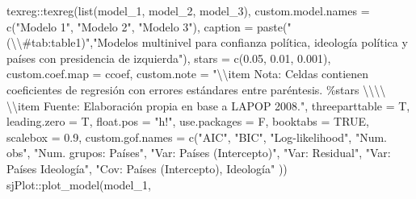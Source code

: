 \documentclass[
  12pt,
  a4paper,
]{article}
\newenvironment{Shaded}{\begin{snugshade}}{\end{snugshade}}
\newcommand{\AttributeTok}[1]{\textcolor[rgb]{0.77,0.63,0.00}{#1}}
\newcommand{\ConstantTok}[1]{\textcolor[rgb]{0.00,0.00,0.00}{#1}}
\newcommand{\FloatTok}[1]{\textcolor[rgb]{0.00,0.00,0.81}{#1}}
\newcommand{\FunctionTok}[1]{\textcolor[rgb]{0.00,0.00,0.00}{#1}}
\newcommand{\NormalTok}[1]{#1}
\newcommand{\SpecialCharTok}[1]{\textcolor[rgb]{0.00,0.00,0.00}{#1}}
\newcommand{\StringTok}[1]{\textcolor[rgb]{0.31,0.60,0.02}{#1}}
\begin{document}
\begin{Shaded}
\begin{Highlighting}[]
\NormalTok{texreg}\SpecialCharTok{::}\FunctionTok{texreg}\NormalTok{(}\FunctionTok{list}\NormalTok{(model\_1, model\_2, model\_3),}
               \AttributeTok{custom.model.names =} \FunctionTok{c}\NormalTok{(}\StringTok{"Modelo 1"}\NormalTok{,}
                                      \StringTok{"Modelo 2"}\NormalTok{,}
                                      \StringTok{"Modelo 3"}\NormalTok{),}
               \AttributeTok{caption =} \FunctionTok{paste}\NormalTok{(}\StringTok{"(}\SpecialCharTok{\textbackslash{}\textbackslash{}}\StringTok{\#tab:table1)"}\NormalTok{,}\StringTok{"Modelos multinivel para confianza política, ideología política y países con presidencia de izquierda"}\NormalTok{),}
               \AttributeTok{stars =} \FunctionTok{c}\NormalTok{(}\FloatTok{0.05}\NormalTok{, }\FloatTok{0.01}\NormalTok{, }\FloatTok{0.001}\NormalTok{),}
               \AttributeTok{custom.coef.map =}\NormalTok{ ccoef,}
               \AttributeTok{custom.note =} \StringTok{"}\SpecialCharTok{\textbackslash{}\textbackslash{}}\StringTok{item Nota: Celdas contienen coeficientes de regresión con errores estándares entre paréntesis. \%stars }\SpecialCharTok{\textbackslash{}\textbackslash{}\textbackslash{}\textbackslash{}}\StringTok{ }\SpecialCharTok{\textbackslash{}\textbackslash{}}\StringTok{item Fuente: Elaboración propia en base a LAPOP 2008."}\NormalTok{,}
               \AttributeTok{threeparttable =}\NormalTok{ T,}
               \AttributeTok{leading.zero =}\NormalTok{ T,}
               \AttributeTok{float.pos =} \StringTok{"h!"}\NormalTok{,}
               \AttributeTok{use.packages =}\NormalTok{ F,}
               \AttributeTok{booktabs =} \ConstantTok{TRUE}\NormalTok{,}
               \AttributeTok{scalebox =} \FloatTok{0.9}\NormalTok{,}
               \AttributeTok{custom.gof.names =} \FunctionTok{c}\NormalTok{(}\StringTok{"AIC"}\NormalTok{, }
                                    \StringTok{"BIC"}\NormalTok{, }
                                    \StringTok{"Log{-}likelihood"}\NormalTok{, }
                                    \StringTok{"Num. obs"}\NormalTok{, }
                                    \StringTok{"Num. grupos: Países"}\NormalTok{,}
                                    \StringTok{"Var: Países (Intercepto)"}\NormalTok{,}
                                    \StringTok{"Var: Residual"}\NormalTok{,}
                                    \StringTok{"Var: Países Ideología"}\NormalTok{,}
                                    \StringTok{"Cov: Países (Intercepto), Ideología"}
\NormalTok{                                    ))}
\NormalTok{sjPlot}\SpecialCharTok{::}\FunctionTok{plot\_model}\NormalTok{(model\_1, }

\end{Highlighting}
\end{Shaded}
\end{document}
